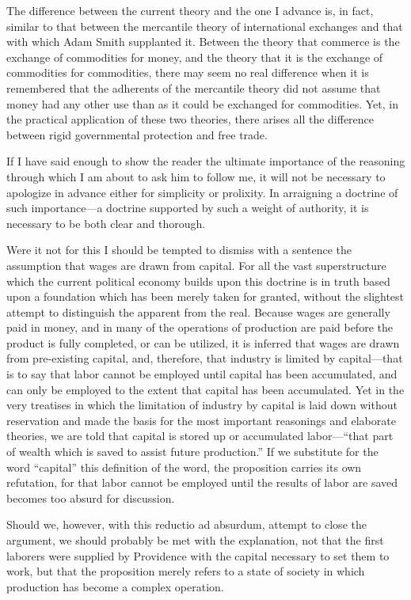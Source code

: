 The difference between the current theory and the one I advance is, in
fact, similar to that between the mercantile theory of international
exchanges and that with which Adam Smith supplanted it. Between the
theory that commerce is the exchange of commodities for money, and the
theory that it is the exchange of commodities for commodities, there may
seem no real difference when it is remembered that the adherents of the
mercantile theory did not assume that money had any other use than as it
could be exchanged for commodities. Yet, in the practical application of
these two theories, there arises all the difference between rigid
governmental protection and free trade.

If I have said enough to show the reader the ultimate importance of the
reasoning through which I am about to ask him to follow me, it will not
be necessary to apologize in advance either for simplicity or prolixity.
In arraigning a doctrine of such importance---a doctrine supported by
such a weight of authority, it is necessary to be both clear and
thorough.

Were it not for this I should be tempted to dismiss with a sentence the
assumption that wages are drawn from capital. For all the vast
superstructure which the current political economy builds upon this
doctrine is in truth based upon a foundation which has been merely taken
for granted, without the slightest attempt to distinguish the apparent
from the real. Because wages are generally paid in money, and in many of
the operations of production are paid before the product is fully
completed, or can be utilized, it is inferred that wages are drawn from
pre-existing capital, and, therefore, that industry is limited by
capital---that is to say that labor cannot be employed until capital has
been accumulated, and can only be employed to the extent that capital
has been accumulated. Yet in the very treatises in which the limitation
of industry by capital is laid down without reservation and made the
basis for the most important reasonings and elaborate theories, we are
told that capital is stored up or accumulated labor---``that part of
wealth which is saved to assist future production.'' If we substitute
for the word ``capital'' this definition of the word, the proposition
carries its own refutation, for that labor cannot be employed until the
results of labor are saved becomes too absurd for discussion.

Should we, however, with this reductio ad absurdum, attempt to close the
argument, we should probably be met with the explanation, not that the
first laborers were supplied by Providence with the capital necessary to
set them to work, but that the proposition merely refers to a state of
society in which production has become a complex operation.

